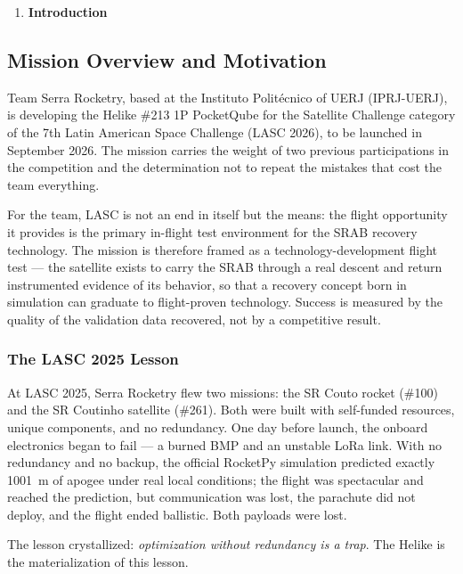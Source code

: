 \begin{enumerate}
\def\labelenumi{\arabic{enumi}.}
\setcounter{enumi}{0}
\item
  \textbf{Introduction}
\end{enumerate}

\subsection{Mission Overview and Motivation}

Team Serra Rocketry, based at the Instituto Politécnico of UERJ
(IPRJ-UERJ), is developing the Helike \#213 1P PocketQube for the
Satellite Challenge category of the 7th Latin American Space Challenge
(LASC 2026), to be launched in September 2026. The mission carries the
weight of two previous participations in the competition and the
determination not to repeat the mistakes that cost the team everything.

For the team, LASC is not an end in itself but the means: the flight
opportunity it provides is the primary in-flight test environment for
the SRAB recovery technology. The mission is therefore framed as a
technology-development flight test --- the satellite exists to carry
the SRAB through a real descent and return instrumented evidence of
its behavior, so that a recovery concept born in simulation can
graduate to flight-proven technology. Success is measured by the
quality of the validation data recovered, not by a competitive
result.

\subsubsection{The LASC 2025 Lesson}

At LASC 2025, Serra Rocketry flew two missions: the SR Couto rocket
(\#100) and the SR Coutinho satellite (\#261). Both were built with
self-funded resources, unique components, and no redundancy. One day
before launch, the onboard electronics began to fail — a burned BMP and
an unstable LoRa link. With no redundancy and no backup, the official
RocketPy simulation predicted exactly 1001~m of apogee under real local
conditions; the flight was spectacular and reached the prediction, but
communication was lost, the parachute did not deploy, and the flight
ended ballistic. Both payloads were lost.

The lesson crystallized: \emph{optimization without redundancy is a
trap}. The Helike is the materialization of this lesson.


